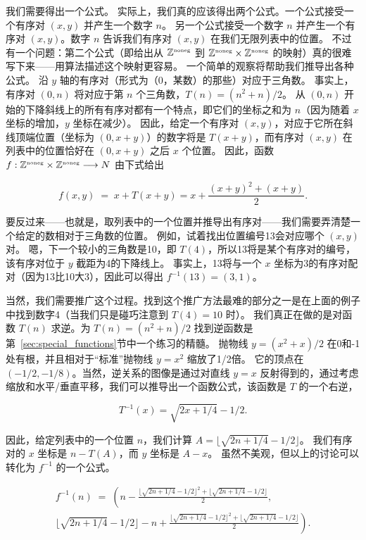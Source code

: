 我们需要得出一个公式。
实际上，我们真的应该得出两个公式。一个公式接受一个有序对 $(x, y)$ 并产生一个数字 $n$。
另一个公式接受一个数字 $n$ 并产生一个有序对 $(x, y)$。数字 $n$ 告诉我们有序对 $(x, y)$ 在我们无限列表中的位置。
不过有一个问题：第二个公式（即给出从 ${\mathbb Z}^{\mbox{\tiny noneg}}$ 到 ${\mathbb Z}^{\mbox{\tiny noneg}} \times {\mathbb Z}^{\mbox{\tiny noneg}}$ 的映射）真的很难写下来——用算法描述这个映射更容易。
一个简单的观察将帮助我们推导出各种公式。
沿 $y$ 轴的有序对（形式为（0，某数）的那些）对应于三角数。
事实上，有序对 $(0, n)$ 将对应于第 $n$ 个三角数，$T(n) = (n^2 + n)/2$。
从 $(0, n)$ 开始的下降斜线上的所有有序对都有一个特点，即它们的坐标之和为 $n$（因为随着 $x$ 坐标的增加，$y$ 坐标在减少）。
因此，给定一个有序对 $(x, y)$，对应于它所在斜线顶端位置（坐标为 $(0, x+y)$）的数字将是 $T(x+y)$，而有序对 $(x, y)$ 在列表中的位置恰好在 $(0, x + y)$ 之后 $x$ 个位置。
因此，函数 $f : {\mathbb Z}^{\mbox{\tiny noneg}} \times {\mathbb Z}^{\mbox{\tiny noneg}} \longrightarrow N$ 由下式给出

\[ f(x, y) \; = \;
    x + T(x + y) = x + \frac{(x + y)^2 + (x + y)}{2}.
\]

\noindent 要反过来——也就是，取列表中的一个位置并推导出有序对——我们需要弄清楚一个给定的数相对于三角数的位置。
例如，试着找出位置编号13会对应哪个 $(x, y)$ 对。
嗯，下一个较小的三角数是10，即 $T(4)$，所以13将是某个有序对的编号，该有序对位于 $y$ 截距为4的下降线上。
事实上，13将与一个 $x$ 坐标为3的有序对配对（因为13比10大3），因此可以得出 $f^{-1}(13) = (3, 1)$。

当然，我们需要推广这个过程。找到这个推广方法最难的部分之一是在上面的例子中找到数字4（当我们只是碰巧注意到 $T(4)=10$ 时）。
我们真正在做的是对函数 $T(n)$ 求逆。为 $T(n) = (n^2+n)/2$ 找到逆函数是第~\ref{sec:special_functions}节中一个练习的精髓。
抛物线 $y = (x^2 + x)/2$ 在0和-1处有根，并且相对于“标准”抛物线 $y = x^2$ 缩放了1/2倍。
它的顶点在 $(-1/2,-1/8)$。当然，逆关系的图像是通过对直线 $y=x$ 反射得到的，通过考虑缩放和水平/垂直平移，我们可以推导出一个函数公式，该函数是 $T$ 的一个右逆，

\[ T^{-1}(x) = \sqrt{2x + 1/4} - 1/2.
\]

因此，给定列表中的一个位置 $n$，我们计算 $A = \lfloor \sqrt{2n + 1/4}-1/2 \rfloor$。
我们有序对的 $x$ 坐标是 $n-T(A)$，而 $y$ 坐标是 $A-x$。
虽然不美观，但以上的讨论可以转化为 $f^{-1}$ 的一个公式。

\begin{gather*}
    f^{-1}(n) \; = \;
    \left( n - \frac{ \lfloor \sqrt{2n + 1/4} - 1/2 \rfloor^2 + \lfloor \sqrt{2n + 1/4} - 1/2 \rfloor}{2} , \right. \\
    \left. \lfloor \sqrt{2n + 1/4} - 1/2  \rfloor - n + \frac{\lfloor \sqrt{2n + 1/4} - 1/2 \rfloor^2 + \lfloor \sqrt{2n + 1/4} - 1/2 \rfloor}{2} \right).
\end{gather*}


